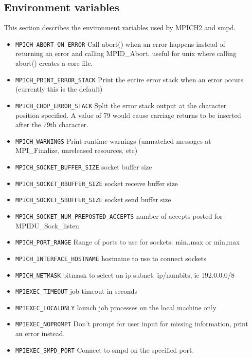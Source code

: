 \documentclass[dvipdfm,11pt]{article}
\begin{document}
\subsection{Environment variables}
This section describes the environment variables used by MPICH2 and smpd.

\begin{itemize}
\item \texttt{MPICH\_ABORT\_ON\_ERROR}
Call abort() when an error happens instead of returning an error and calling MPID\_Abort. useful for unix where calling abort() creates a core file.
\item \texttt{MPICH\_PRINT\_ERROR\_STACK}
Print the entire error stack when an error occurs (currently this is the default)
\item \texttt{MPICH\_CHOP\_ERROR\_STACK}
Split the error stack output at the character position specified.  A value of 79
would cause carriage returns to be inserted after the 79th character.
\item \texttt{MPICH\_WARNINGS}
Print runtime warnings (unmatched messages at MPI\_Finalize, unreleased resources, etc)
\item \texttt{MPICH\_SOCKET\_BUFFER\_SIZE}
socket buffer size
\item \texttt{MPICH\_SOCKET\_RBUFFER\_SIZE}
socket receive buffer size
\item \texttt{MPICH\_SOCKET\_SBUFFER\_SIZE}
socket send buffer size
\item \texttt{MPICH\_SOCKET\_NUM\_PREPOSTED\_ACCEPTS}
number of accepts posted for MPIDU\_Sock\_listen
\item \texttt{MPICH\_PORT\_RANGE}
Range of ports to use for sockets: min..max or min,max
\item \texttt{MPICH\_INTERFACE\_HOSTNAME}
hostname to use to connect sockets
\item \texttt{MPICH\_NETMASK}
bitmask to select an ip subnet: ip/numbits, ie 192.0.0.0/8
\item \texttt{MPIEXEC\_TIMEOUT}
job timeout in seconds
\item \texttt{MPIEXEC\_LOCALONLY}
launch job processes on the local machine only
\item \texttt{MPIEXEC\_NOPROMPT}
Don't prompt for user input for missing information, print an error instead.
\item \texttt{MPIEXEC\_SMPD\_PORT}
Connect to smpd on the specified port.


\end{itemize}
\end{document}
